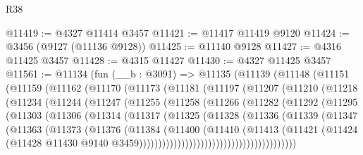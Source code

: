 \begin{lexlean}{R38}
\begin{coremodule}
@11419 := @4327 @11414 @3457
@11421 := @11417 @11419 @9120
@11424 := @3456 (@9127 (@11136 @9128))
@11425 := @11140 @9128
@11427 := @4316 @11425 @3457
@11428 := @4315 @11427
@11430 := @4327 @11425 @3457
@11561 := @11134
    (fun (__b : @3091) =>
    @11135
      (@11139
        (@11148
          (@11151
            (@11159
              (@11162
                (@11170
                  (@11173
                    (@11181
                      (@11197
                        (@11207
                          (@11210
                            (@11218
                              (@11234
                                (@11244
                                  (@11247
                                    (@11255
                                      (@11258
                                        (@11266
                                          (@11282
                                            (@11292
                                              (@11295
                                                (@11303
                                                  (@11306
                                                    (@11314
                                                      (@11317
                                                        (@11325
                                                          (@11328
                                                            (@11336
                                                              (@11339
                                                                (@11347
                                                                  (@11363
                                                                    (@11373
                                                                      (@11376
                                                                        (@11384
                                                                          (@11400
                                                                            (@11410
                                                                              (@11413
                                                                                (@11421
                                                                                  (@11424
                                                                                    (@11428
                                                                                      @11430
                                                                                      @9140
                                                                                      @3459)))))))))))))))))))))))))))))))))))))))))

\end{coremodule}
\end{lexlean}
